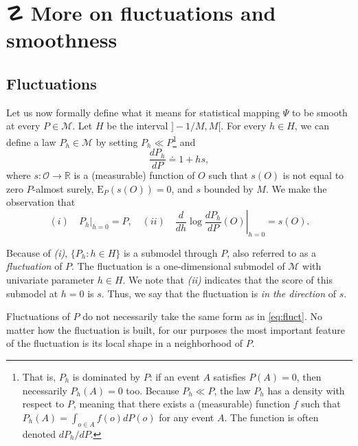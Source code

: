 \documentclass[11pt,openright,twoside]{book}
\DeclareRobustCommand{\stixdanger}{%
  {\usefont{U}{stixbbit}{m}{it}\symbol{"F6}}%
}
\newcommand{\bbR}{\mathbb{R}}
\newcommand{\defq}{\doteq}
\newcommand{\calM}{\mathcal{M}}
\newcommand{\calO}{\mathcal{O}}
\newcommand{\Exp}{\textrm{E}}
\theoremstyle{definition}
\theoremstyle{definition}
\theoremstyle{definition}
\theoremstyle{remark}
\begin{document}
\hypertarget{smooth-second-pass}{%
\section{\texorpdfstring{☡ \stixdanger{} More on fluctuations and smoothness}{☡  More on fluctuations and smoothness}}\label{smooth-second-pass}}

\hypertarget{smooth-second-pass-fluctuations}{%
\subsection{Fluctuations}\label{smooth-second-pass-fluctuations}}

Let us now formally define what it means for statistical mapping \(\Psi\) to be
smooth at every \(P \in \calM\). Let \(H\) be the interval \(]-1/M,M[\). For every
\(h \in H\), we can define a law \(P_{h} \in \calM\) by setting \(P_{h} \ll P\)\footnote{That is, \(P_{h}\) is dominated by \(P\): if an event \(A\) satisfies \(P(A) = 0\), then necessarily \(P_{h} (A) = 0\) too. Because \(P_{h} \ll P\), the law
  \(P_{h}\) has a density with respect to \(P\), meaning that there exists a
  (measurable) function \(f\) such that \(P_{h}(A) = \int_{o \in A} f(o) dP(o)\) for
  any event \(A\). The function is often denoted \(dP_{h}/dP\).} and
\begin{equation} \frac{dP_h}{dP} \defq 1 + h s, 
\label{eq:fluct} \end{equation}
where \(s : \calO\to \bbR\) is a (measurable) function of \(O\) such that \(s(O)\)
is not equal to zero \(P\)-almost surely, \(\Exp_{P} (s(O)) = 0\), and \(s\) bounded
by \(M\). We make the observation that
\begin{equation} (i) \quad P_h|_{h=0} =
P,\quad  (ii)  \quad \left.\frac{d}{dh}  \log  \frac{dP_h}{dP}(O)\right|_{h=0}
=s(O).  \label{eq:score} 
\end{equation}

Because of \emph{(i)}, \(\{P_{h} : h \in H\}\) is a submodel through \(P\), also
referred to as a \emph{fluctuation} of \(P\). The fluctuation is a one-dimensional
submodel of \(\calM\) with univariate parameter \(h \in H\). We note that \emph{(ii)}
indicates that the score of this submodel at \(h = 0\) is \(s\). Thus, we say
that the fluctuation is \emph{in the direction} of \(s\).

Fluctuations of \(P\) do not necessarily take the same form as in
\eqref{eq:fluct}. No matter how the fluctuation is built, for our purposes the
most important feature of the fluctuation is its local shape in a neighborhood
of \(P\).
\end{document}

